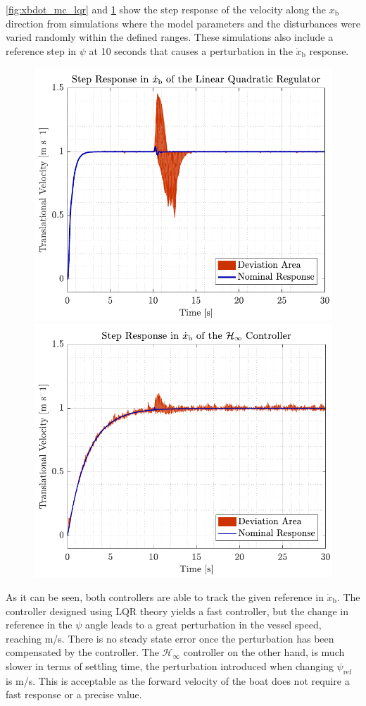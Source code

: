 \autoref{fig:xbdot_mc_lqr} and \ref{fig:xbdot_mc_rob} show the step response of the velocity along the $x_\mathrm{b}$ direction from  simulations where the model parameters and the disturbances were varied randomly within the defined ranges. These simulations also include a reference step in $\psi$ at 10 seconds that causes a perturbation in the $\dot{x}_\mathrm{b}$ response. 
\begin{figure}[H]
    \captionbox 
    {   
        \label{fig:xbdot_mc_lqr}
    }                                                                 
    {                                                                  
        \includegraphics[width=.45\textwidth]{figures/xbdot_mc_lqr}         
    }                                                                    
    \hspace{5pt}                                                          
    \captionbox  
    {      
        \label{fig:xbdot_mc_rob}
    }                                                                          
    {
        \includegraphics[width=.45\textwidth]{figures/xbdot_mc_rob}
    }
\end{figure}
As it can be seen, both controllers are able to track the given reference in $\dot{x}_\mathrm{b}$. The controller designed using LQR theory yields a fast controller, but the change in reference in the $\psi$ angle leads to a great perturbation in the vessel speed, reaching  m/s. There is no steady state error once the perturbation has been compensated by the controller. The $\mathcal{H}_\infty$ controller on the other hand, is much slower in terms of settling time, the perturbation introduced when changing $\psi_\mathrm{ref}$ is  m/s. This is acceptable as the forward velocity of the boat does not require a fast response or a precise value.


